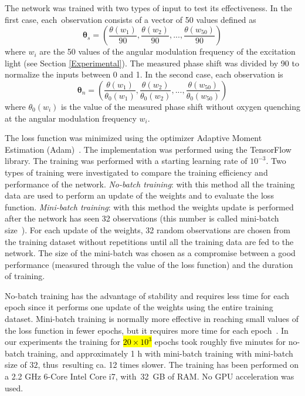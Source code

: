\documentclass[sensors,article,accept,moreauthors,pdftex,10pt,a4paper]{Definitions/mdpi}
\begin{document}
The network was trained with two types of input to test its effectiveness. In the first case, each~observation consists of a vector of 50 values defined as
\begin{equation}
\label{input1}
{\pmb \theta}_s = \left(
\frac{\theta(w_1)}{90} , \frac{\theta(w_2)}{90} , ..., \frac{\theta(w_{50})}{90} 
\right)
\end{equation}
where $w_i$ are the 50 values of the angular modulation frequency of the excitation light (see Section \ref{Experimental}). The measured phase shift was divided by 90 to normalize the inputs between 0 and 1. In the second case, each observation is
\begin{equation}
\label{input2}
{\pmb \theta}_n = \left(
\frac{\theta(w_1)}{\theta_0(w_1)} , \frac{\theta(w_2)}{\theta_0(w_2)} , ..., \frac{\theta(w_{50})}{\theta_0(w_{50})} 
\right)
\end{equation}
where $\theta_0(w_i)$ is the value of the measured phase shift without oxygen quenching at the angular modulation frequency $w_i$.

The loss function was minimized using the optimizer Adaptive Moment Estimation \mbox{(Adam)~\cite{Kingma2014, Michelucci2017}}. The implementation was performed using the TensorFlow\texttrademark $\ $library. The training was performed with a starting learning rate of $10^{-3}$. Two types of training were investigated to compare the training efficiency and performance of the network. {\sl No-batch training}: with this method all the training data  are used to perform an update of the weights and to evaluate the loss function. {\sl Mini-batch training}: with this method the weights update is performed after the network has seen 32 observations (this number is called mini-batch size~\cite{Michelucci2017}). For each update of the weights, 32 random observations are chosen from the training dataset without repetitions until all the training data are fed to the network. 
The size of the mini-batch was chosen as a compromise between a good performance (measured through the value of the loss function) and the duration of training.

No-batch training has the advantage of stability and requires less time for each epoch since it performs one update of the weights using the entire training dataset. Mini-batch training is normally more effective in reaching small values of the loss function in fewer epochs, but it requires more time for each epoch~\cite{Michelucci2017}. In our experiments the training for \hl{$20 \times 10^3$} %
 epochs took roughly five minutes for no-batch training, and approximately 1 h with mini-batch training with mini-batch size of $32$, thus~resulting ca. 12 times slower. The training has been performed on a 2.2 GHz 6-Core Intel Core i7, with~32~GB of RAM. No GPU acceleration was used. 
\end{document}
